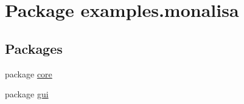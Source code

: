 \hypertarget{namespaceexamples_1_1monalisa}{\section{Package examples.\-monalisa}
\label{namespaceexamples_1_1monalisa}
}
\subsection*{Packages}
\begin{DoxyCompactItemize}
\item 
package \hyperlink{namespaceexamples_1_1monalisa_1_1core}{core}
\item 
package \hyperlink{namespaceexamples_1_1monalisa_1_1gui}{gui}
\end{DoxyCompactItemize}
